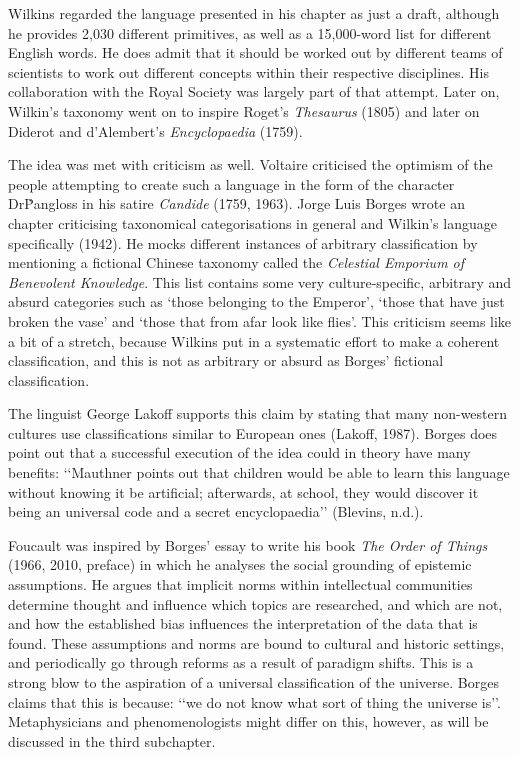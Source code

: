 Wilkins regarded the language presented in his chapter as just a draft, although he provides 2,030 different primitives, as well as a 15,000-word list for different English words. He does admit that it should be worked out by different teams of scientists to work out different concepts within their respective disciplines. His collaboration with the Royal Society was largely part of that attempt. Later on, Wilkin’s taxonomy went on to inspire Roget’s {\it Thesaurus} (1805) and later on Diderot and d’Alembert’s {\it Encyclopaedia} (1759).  

The idea was met with criticism as well. Voltaire criticised the optimism of the people attempting to create such a language in the form of the character Dr\.Pangloss in his satire \textit{Candide} (1759, 1963). Jorge Luis Borges wrote an chapter criticising taxonomical categorisations in general and Wilkin’s language specifically (1942). He mocks different instances of arbitrary classification by mentioning a fictional Chinese taxonomy called the \textit{Celestial Emporium of Benevolent Knowledge}. This list contains some very culture-specific, arbitrary and absurd categories such as ‘those belonging to the Emperor’, ‘those that have just broken the vase’ and ‘those that from afar look like flies’. This criticism seems like a bit of a stretch, because Wilkins put in a systematic effort to make a coherent classification, and this is not as arbitrary or absurd as Borges’ fictional classification. 

The linguist George Lakoff supports this claim by stating that many non-western cultures use classifications similar to European ones (Lakoff, 1987). Borges does point out that a successful execution of the idea could in theory have many benefits: ‘‘Mauthner points out that children would be able to learn this language without knowing it be artificial; afterwards, at school, they would discover it being an universal code and a secret encyclopaedia’’ (Blevins, n.d.). 

Foucault was inspired by Borges’ essay to write his book \textit{The Order of Things} (1966, 2010, preface) in which he analyses the social grounding of epistemic assumptions. He argues that implicit norms within intellectual communities determine thought and influence which topics are researched, and which are not, and how the established bias influences the interpretation of the data that is found. These assumptions and norms are bound  to cultural and historic settings, and periodically go through reforms as a result of paradigm shifts. This is a strong blow to the aspiration of a universal classification of the universe. Borges claims that this is because: ‘‘we do not know what sort of thing the universe is’’. Metaphysicians and phenomenologists might differ on this, however, as will be discussed in the third subchapter.  

